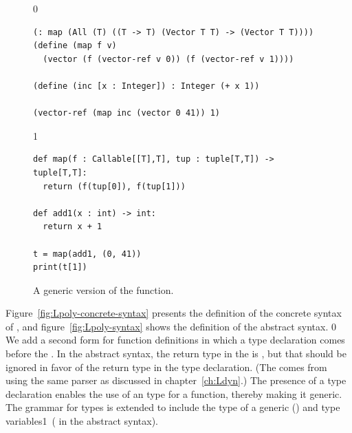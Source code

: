 \documentclass[7x10]{TimesAPriori_MIT}%
\def\racketEd{0}
\def\pythonEd{1}
\providecommand{\BookEdition}{1}
\let\edition\BookEdition
\newcommand{\pythonColor}[0]{}
\newcommand{\python}[1]{{\if\edition\pythonEd\pythonColor #1\fi}}
\numberwithin{theorem}{chapter}
\numberwithin{definition}{chapter}
\numberwithin{equation}{chapter}
\begin{document}
\begin{figure}[tbp]
\begin{tcolorbox}[colback=white]  
{\if\edition\racketEd
\begin{lstlisting}
(: map (All (T) ((T -> T) (Vector T T) -> (Vector T T))))
(define (map f v)
  (vector (f (vector-ref v 0)) (f (vector-ref v 1))))

(define (inc [x : Integer]) : Integer (+ x 1))

(vector-ref (map inc (vector 0 41)) 1)
\end{lstlisting}
\fi}
{\if\edition\pythonEd\pythonColor
\begin{lstlisting}
def map(f : Callable[[T],T], tup : tuple[T,T]) -> tuple[T,T]:
  return (f(tup[0]), f(tup[1]))

def add1(x : int) -> int:
  return x + 1

t = map(add1, (0, 41))
print(t[1])
\end{lstlisting}
\fi}
\end{tcolorbox}

\caption{A generic version of the  function.}
\label{fig:map-poly}
\end{figure}

Figure~\ref{fig:Lpoly-concrete-syntax} presents the definition of the
concrete syntax of \LangPoly{}, and figure~\ref{fig:Lpoly-syntax}
shows the definition of the abstract syntax.
%
{\if\edition\racketEd
We add a second form for function definitions in which a type
declaration comes before the . In the abstract syntax,
the return type in the  is \CANYTY{}, but that should be
ignored in favor of the return type in the type declaration.  (The
\CANYTY{} comes from using the same parser as discussed in
chapter~\ref{ch:Ldyn}.)  The presence of a type declaration
enables the use of an  type for a function, thereby making
it generic.
\fi}
%
The grammar for types is extended to include the type of a generic
() and type variables\python{\ ( in the
  abstract syntax)}.

\newcommand{\LpolyGrammarRacket}{
\begin{array}{lcl}
  \Type &::=& \LP\key{All}~\LP\Var\ldots\RP~ \Type\RP \MID \Var \\
  \Def &::=& \LP\key{:}~\Var~\Type\RP \\
    &&       \LP\key{define}~ \LP\Var ~ \Var\ldots\RP ~ \Exp\RP 
\end{array}
}

\newcommand{\LpolyASTRacket}{
\begin{array}{lcl}
  \Type &::=& \LP\key{All}~\LP\Var\ldots\RP~ \Type\RP \MID \Var \\
  \Def &::=& \DECL{\Var}{\Type} \\
   &&  \DEF{\Var}{\LP\Var \ldots\RP}{\key{'Any}}{\code{'()}}{\Exp}  
\end{array}
}  
\end{document}
